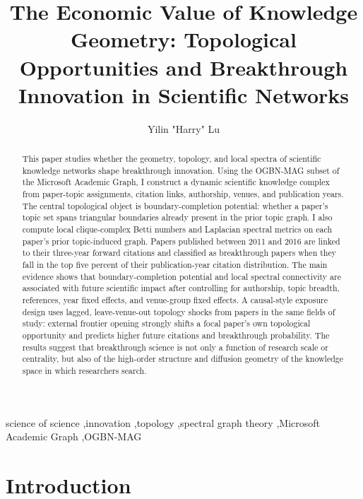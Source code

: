 \documentclass[preprint,12pt,authoryear]{elsarticle}
\begin{document}
\begin{frontmatter}

\title{The Economic Value of Knowledge Geometry: Topological Opportunities and Breakthrough Innovation in Scientific Networks}

\author[umn]{Yilin "Harry" Lu}
\address[umn]{University of Minnesota}

\begin{abstract}
This paper studies whether the geometry, topology, and local spectra of scientific knowledge networks shape breakthrough innovation. Using the OGBN-MAG subset of the Microsoft Academic Graph, I construct a dynamic scientific knowledge complex from paper-topic assignments, citation links, authorship, venues, and publication years. The central topological object is boundary-completion potential: whether a paper's topic set spans triangular boundaries already present in the prior topic graph. I also compute local clique-complex Betti numbers and Laplacian spectral metrics on each paper's prior topic-induced graph. Papers published between 2011 and 2016 are linked to their three-year forward citations and classified as breakthrough papers when they fall in the top five percent of their publication-year citation distribution. The main evidence shows that boundary-completion potential and local spectral connectivity are associated with future scientific impact after controlling for authorship, topic breadth, references, year fixed effects, and venue-group fixed effects. A causal-style exposure design uses lagged, leave-venue-out topology shocks from papers in the same fields of study: external frontier opening strongly shifts a focal paper's own topological opportunity and predicts higher future citations and breakthrough probability. The results suggest that breakthrough science is not only a function of research scale or centrality, but also of the high-order structure and diffusion geometry of the knowledge space in which researchers search.
\end{abstract}

\begin{keyword}
science of science \sep innovation \sep topology \sep spectral graph theory \sep Microsoft Academic Graph \sep OGBN-MAG
\end{keyword}

\end{frontmatter}


\onehalfspacing

\section{Introduction}
\end{document}

